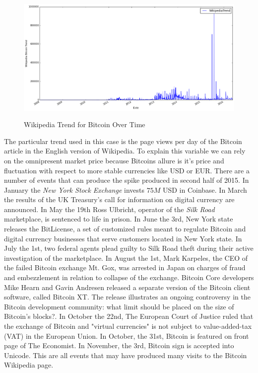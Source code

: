 \begin{figure}[bth]
  \myfloatalign
  {\includegraphics[width=1\linewidth]
    {gfx/wikipedia-trend-for-bitcoin-over-time}}
  \caption{Wikipedia Trend for Bitcoin
    Over Time}
  \label{fig:wikipedia-trend-for-bitcoin-over-time}
\end{figure}

The particular trend used in this case is the page views per day of
the Bitcoin article in the English version of Wikipedia. To explain
this variable we can rely on the omnipresent market price because
Bitcoins allure is it's price and fluctuation with respect to more
stable currencies like USD or EUR. There are a number of events that
can produce the spike produced in second half of 2015. In January the
\textit{New York Stock Exchange} invests $75M$
USD in Coinbase. In March the results of the UK Treasury's call for
information on digital currency are announced. In May the 19th Ross
Ulbricht, operator of the \textit{Silk Road} marketplace, is sentenced
to life in prison. In June the 3rd, New York state releases the
BitLicense, a set of customized rules meant to regulate Bitcoin and
digital currency businesses that serve customers located in New York
state. In July the 1st, two federal agents plead guilty to Silk Road
theft during their active investigation of the marketplace. In August
the 1st, Mark Karpeles, the CEO of the failed Bitcoin exchange Mt.
Gox, was arrested in Japan on charges of fraud and embezzlement in
relation to collapse of the exchange. Bitcoin Core developers Mike
Hearn and Gavin Andresen released a separate version of the Bitcoin
client software, called Bitcoin XT. The release illustrates an ongoing
controversy in the Bitcoin development community: what limit should be
placed on the size of Bitcoin's blocks?. In October the 22nd, The
European Court of Justice ruled that the exchange of Bitcoin and
"virtual currencies" is not subject to value-added-tax (VAT) in the
European Union. In October, the 31st, Bitcoin is featured on front
page of The Economist. In November, the 3rd, Bitcoin sign is accepted
into Unicode. This are all events that may have produced many visits
to the Bitcoin Wikipedia page.

